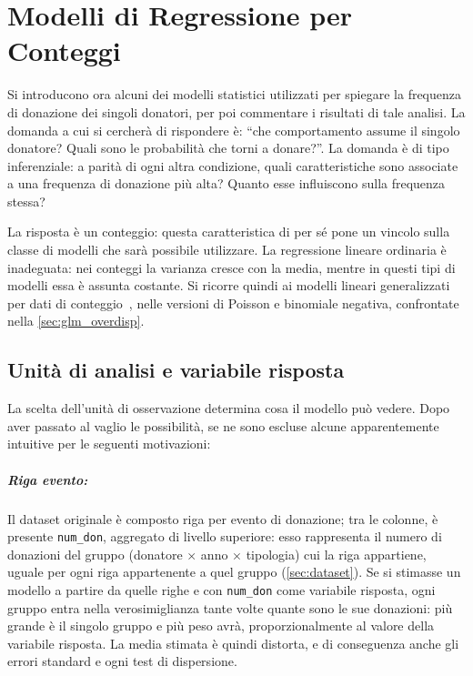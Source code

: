 
\chapter{Modelli di Regressione per Conteggi}
\label{ch:glm}
Si introducono ora alcuni dei modelli statistici utilizzati per spiegare la 
frequenza di donazione dei singoli donatori, per poi commentare i risultati di
tale analisi. La domanda a cui si cercherà di rispondere è:
``che comportamento assume il singolo donatore? Quali sono
le probabilità che torni a donare?''. La domanda è di tipo inferenziale: a
parità di ogni altra condizione, quali caratteristiche sono associate a una
frequenza di donazione più alta? Quanto esse influiscono sulla frequenza stessa?

La risposta è un conteggio: questa caratteristica di per sé pone un vincolo
sulla classe di modelli che sarà possibile utilizzare.
La regressione lineare ordinaria è inadeguata: nei conteggi la varianza cresce con
la media, mentre in questi tipi di modelli essa è assunta costante.
Si ricorre quindi ai modelli lineari generalizzati per dati di
conteggio~\cite{CameronTrivedi2013}, nelle versioni di Poisson e binomiale
negativa, confrontate nella \cref{sec:glm_overdisp}.

\section{Unità di analisi e variabile risposta}
\label{sec:glm_unit}

La scelta dell'unità di osservazione
determina cosa il modello può vedere. Dopo aver passato al vaglio le possibilità,
se ne sono escluse alcune apparentemente intuitive per le seguenti motivazioni:

\paragraph{Riga evento: }
Il dataset originale è composto riga per evento di donazione; tra le colonne,
è presente \texttt{num\_don}, aggregato di livello
superiore: esso rappresenta il numero di donazioni del gruppo (donatore $\times$ anno $\times$
tipologia) cui la riga appartiene, uguale per ogni riga appartenente a quel gruppo
(\cref{sec:dataset}). Se si stimasse un modello a partire da quelle righe e con \texttt{num\_don}
come variabile risposta, ogni gruppo entra nella verosimiglianza tante volte quante sono
le sue donazioni: più grande è il singolo gruppo e più peso avrà, proporzionalmente
al valore della variabile risposta. La media stimata è quindi distorta, e di conseguenza
anche gli errori standard e ogni test di dispersione. 

